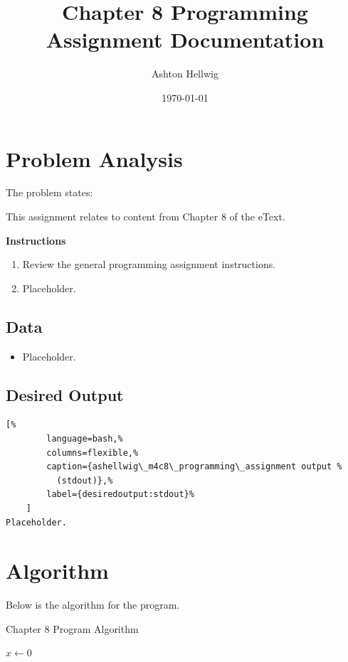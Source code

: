 \documentclass[a4paper, 11pt]{article}
\title{Chapter 8 Programming Assignment Documentation}
\author{Ashton Hellwig}
\date\today
\theoremstyle{definition}
\theoremstyle{plain}
\begin{document}
  \maketitle
  \tableofcontents
  \listofalgorithms
  \lstlistoflistings
  \newpage


  \section{Problem Analysis}
    The problem states:
    \begin{mdframed}[backgroundcolor=green!20]
      This assignment relates to content from Chapter 8 of the eText.

      \textbf{Instructions}\vspace{-8pt}
      \begin{enumerate}
        \item Review the general programming assignment instructions.
        \item Placeholder.
      \end{enumerate}
    \end{mdframed}

    \subsection{Data}
      \begin{itemize}
        \item Placeholder.
      \end{itemize}

    \subsection{Desired Output}
      \begin{lstlisting}[%
        language=bash,%
        columns=flexible,%
        caption={ashellwig\_m4c8\_programming\_assignment output %
          (stdout)},%
        label={desiredoutput:stdout}%
    ]
Placeholder.
  \end{lstlisting}


  \newpage
  \section{Algorithm}
    Below is the algorithm for the program.
    \begin{algorithm}[H]
      \caption{Chapter 8 Program Algorithm}
      \vspace{12pt}
      \begin{algorithmic}[1]
          \State $x\gets 0$
        \EndProcedure
      \end{algorithmic}
      \label{alg}
    \end{algorithm}
\end{document}
